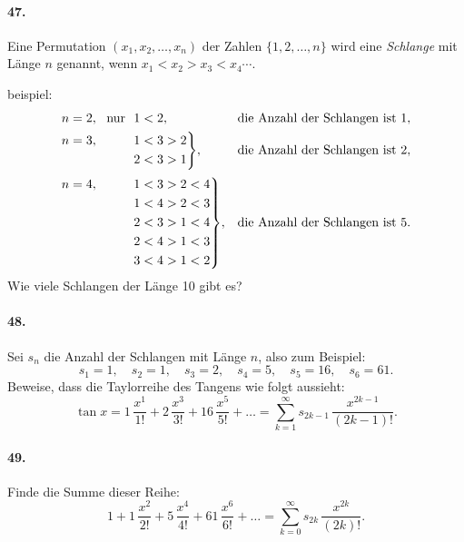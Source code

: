 \documentclass[10pt,a5paper,twoside]{article}
\newenvironment{problem}[1]{\paragraph*{#1}}{}
\begin{document}
\begin{problem}{47.}
	Eine Permutation $(x_1,x_2, \dots,x_n)$ der Zahlen $\{1, 2, \dotsc, n\}$ wird eine
	\emph{Schlange} mit Länge $n$ genannt, wenn $x_1<x_2>x_3<x_4 \dotsb$.

	{\noindent\sc beispiel:\nopagebreak}
	\begin{equation*}
	\begin{aligned}[t]
	&\begin{aligned}[t] n=2, \text{\ \ nur\ \ } 1<2, \end{aligned} &&\text{die Anzahl der Schlangen ist }1, \\
	&\hskip-\nulldelimiterspace\mathord{\left.\begin{aligned} n=3, \hphantom{\text{\ \ nur\ \ }} 1&<3>2 \\ 
	2&<3>1\end{aligned} \right\}}, && \text{die Anzahl der Schlangen ist }2, \\[2pt]
	&\hskip-\nulldelimiterspace\mathord{\left.\begin{aligned} n=4, \hphantom{\text{\ \ nur\ \ }} 1&<3>2<4 \\ 
	1&<4>2<3 \\ 
	2&<3>1<4 \\ 
	2&<4>1<3 \\ 
	3&<4>1<2\end{aligned} \right\}},
	&&\text{die Anzahl der Schlangen ist }5. \\
	\end{aligned}
	\end{equation*}
	Wie viele Schlangen der Länge 10 gibt es?
\end{problem}

\begin{problem}{48.}
	Sei $s_n$ die Anzahl der Schlangen mit Länge $n$, also zum Beispiel: 
	\begin{equation*}
	s_1=1, \quad s_2=1, \quad s_3=2, \quad s_4=5, \quad s_5=16, \quad s_6=61.
	\end{equation*}
	Beweise, dass die Taylorreihe des Tangens wie folgt aussieht: 
	\begin{equation*}
	\tan x=1\, \frac{x^1}{1!}+2\, \frac{x^3}{3!}+16\, \frac{x^5}{5!}+\dots=
	\textstyle\sum\limits_{k=1}^{\infty} s_{2k-1}\, \frac{x^{2k-1}}{(2k-1)!}.
\end{equation*}
\end{problem}

\begin{problem}{49.}
	Finde die Summe dieser Reihe:
	\begin{equation*}
	1+1\, \frac{x^2}{2!}+5\, \frac{x^4}{4!}+61\, \frac{x^6}{6!}+\dots=
	\textstyle\sum\limits_{k=0}^{\infty} s_{2k}\,\frac{x^{2k}}{(2k)!}.
\end{equation*}
\end{problem}
\end{document}
